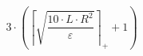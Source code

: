 \[3 \cdot \left(\left\lceil \sqrt{\frac{10 \cdot L \cdot R^{2}}{\varepsilon}} \right\rceil_{+} + 1\right)\]
